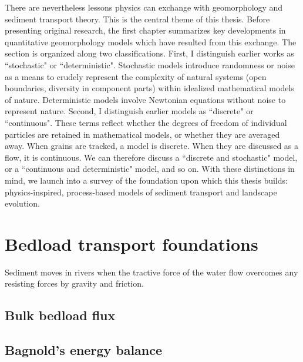 There are nevertheless lessons physics can exchange with geomorphology and sediment transport theory. This is the central theme of this thesis. Before presenting original research, the first chapter summarizes key developments in quantitative geomorphology models which have resulted from this exchange. The section is organized along two classifications. First, I distinguish earlier works as ``stochastic" or ``deterministic". Stochastic models introduce randomness or noise as a means to crudely represent the complexity of natural systems (open boundaries, diversity in component parts) within idealized mathematical models of nature. Deterministic models involve Newtonian equations without noise to represent nature. Second, I distinguish earlier models as ``discrete" or ``continuous". These terms reflect whether the degrees of freedom of individual particles are retained in mathematical models, or whether they are averaged away. When grains are tracked, a model is discrete. When they are discussed as a flow, it is continuous. We can therefore discuss a ``discrete and stochastic" model, or a ``continuous and deterministic" model, and so on.
With these distinctions in mind, we launch into a survey of the foundation upon which this thesis builds: physics-inspired, process-based models of sediment transport and landscape evolution.

\section{Bedload transport foundations}

Sediment moves in rivers when the tractive force of the water flow overcomes any resisting forces by gravity and friction. 

\subsection{Bulk bedload flux}


\subsection{Bagnold's energy balance}

